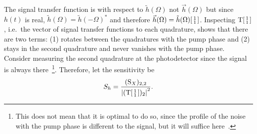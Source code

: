 The signal transfer function is with respect to $\tilde h(\Omega)$ not $\vec h(\Omega)$ but since $h(t)$ is real, $\tilde h(\Omega)=\tilde h(-\Omega)^*$ and therefore $\vec h(\Omega)=\tilde h(\Omega) \begin{bsmallmatrix}1 \\1\end{bsmallmatrix}$.
Inspecting $\text{T}\begin{bsmallmatrix}1 \\1\end{bsmallmatrix}$ , i.e.\ the vector of signal transfer functions to each quadrature, shows that there are two terms: (1) rotates between the quadratures with the pump phase and (2) stays in the second quadrature and never vanishes with the pump phase. Consider measuring the second quadrature at the photodetector since the signal is always there~\footnote{This does not mean that it is optimal to do so, since the profile of the noise with the pump phase is different to the signal, but it will suffice here~\cite{}. }.
Therefore, let the sensitivity be
\begin{equation}
S_h = \frac{(\text{S}_X)_{2,2}}{\abs{(\text{T}\begin{bsmallmatrix}1 \\1\end{bsmallmatrix})_2}^2}.
\end{equation}

